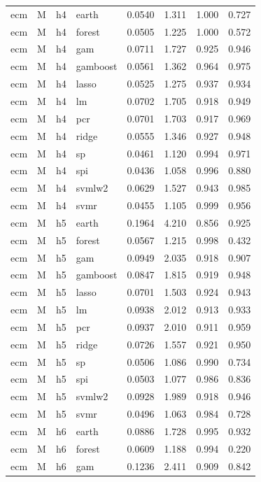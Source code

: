 \begin{ThreePartTable}
\begin{longtable}[t]{llclcccc}
\addlinespace
ecm & M & h4 & earth & 0.0540 & 1.311 & 1.000 & 0.727\\
ecm & M & h4 & forest & 0.0505 & 1.225 & 1.000 & 0.572\\
ecm & M & h4 & gam & 0.0711 & 1.727 & 0.925 & 0.946\\
ecm & M & h4 & gamboost & 0.0561 & 1.362 & 0.964 & 0.975\\
ecm & M & h4 & lasso & 0.0525 & 1.275 & 0.937 & 0.934\\
ecm & M & h4 & lm & 0.0702 & 1.705 & 0.918 & 0.949\\
ecm & M & h4 & pcr & 0.0701 & 1.703 & 0.917 & 0.969\\
ecm & M & h4 & ridge & 0.0555 & 1.346 & 0.927 & 0.948\\
ecm & M & h4 & sp & 0.0461 & 1.120 & 0.994 & 0.971\\
ecm & M & h4 & spi & 0.0436 & 1.058 & 0.996 & 0.880\\
ecm & M & h4 & svmlw2 & 0.0629 & 1.527 & 0.943 & 0.985\\
ecm & M & h4 & svmr & 0.0455 & 1.105 & 0.999 & 0.956\\
\addlinespace
ecm & M & h5 & earth & 0.1964 & 4.210 & 0.856 & 0.925\\
ecm & M & h5 & forest & 0.0567 & 1.215 & 0.998 & 0.432\\
ecm & M & h5 & gam & 0.0949 & 2.035 & 0.918 & 0.907\\
ecm & M & h5 & gamboost & 0.0847 & 1.815 & 0.919 & 0.948\\
ecm & M & h5 & lasso & 0.0701 & 1.503 & 0.924 & 0.943\\
ecm & M & h5 & lm & 0.0938 & 2.012 & 0.913 & 0.933\\
ecm & M & h5 & pcr & 0.0937 & 2.010 & 0.911 & 0.959\\
ecm & M & h5 & ridge & 0.0726 & 1.557 & 0.921 & 0.950\\
ecm & M & h5 & sp & 0.0506 & 1.086 & 0.990 & 0.734\\
ecm & M & h5 & spi & 0.0503 & 1.077 & 0.986 & 0.836\\
ecm & M & h5 & svmlw2 & 0.0928 & 1.989 & 0.918 & 0.946\\
ecm & M & h5 & svmr & 0.0496 & 1.063 & 0.984 & 0.728\\
\addlinespace
ecm & M & h6 & earth & 0.0886 & 1.728 & 0.995 & 0.932\\
ecm & M & h6 & forest & 0.0609 & 1.188 & 0.994 & 0.220\\
ecm & M & h6 & gam & 0.1236 & 2.411 & 0.909 & 0.842\\

\end{longtable}
\end{ThreePartTable}
